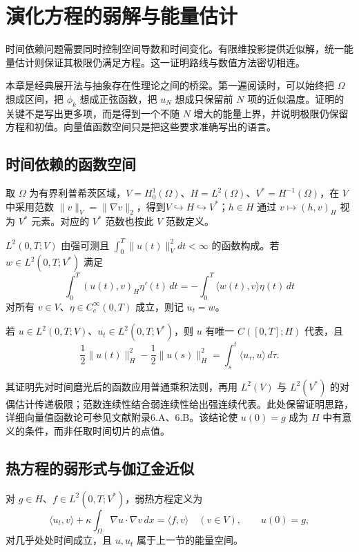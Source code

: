 \documentclass[UTF8,12pt,a4paper,fontset=fandol]{ctexbook}
\begin{document}
\chapter{演化方程的弱解与能量估计}
\label{chap:evolution-weak}

时间依赖问题需要同时控制空间导数和时间变化。有限维投影提供近似解，统一能量估计则保证其极限仍满足方程。这一证明路线与数值方法密切相连。

本章是经典展开法与抽象存在性理论之间的桥梁。第一遍阅读时，可以始终把 $\Omega$ 想成区间，把 $\phi_k$ 想成正弦函数，把 $u_N$ 想成只保留前 $N$ 项的近似温度。证明的关键不是写出更多项，而是得到一个不随 $N$ 增大的能量上界，并说明极限仍保留方程和初值。向量值函数空间只是把这些要求准确写出的语言。

\section{时间依赖的函数空间}
取 $\Omega$ 为有界利普希茨区域，$V=H_0^1(\Omega)$、$H=L^2(\Omega)$、$V^*=H^{-1}(\Omega)$，在 $V$ 中采用范数 $\|v\|_V=\|\nabla v\|_2$，得到$V\hookrightarrow H\hookrightarrow V^*$；$h\in H$ 通过 $v\mapsto(h,v)_H$ 视为 $V^*$ 元素。对应的 $V^*$ 范数也按此 $V$ 范数定义。

$L^2(0,T;V)$ 由强可测且 $\int_0^T\|u(t)\|_V^2dt<\infty$ 的函数构成。若 $w\in L^2(0,T;V^*)$ 满足
\[
 \int_0^T(u(t),v)_H\eta'(t)\,dt
 =-\int_0^T\langle w(t),v\rangle\eta(t)\,dt
\]
对所有 $v\in V$、$\eta\in C_c^\infty(0,T)$ 成立，则记 $u_t=w$。

\begin{theorem}[能量空间的时间连续性]
若 $u\in L^2(0,T;V)$、$u_t\in L^2(0,T;V^*)$，则 $u$ 有唯一 $C([0,T];H)$ 代表，且
\begin{equation}
 \frac12\|u(t)\|_H^2-\frac12\|u(s)\|_H^2
 =\int_s^t\langle u_\tau,u\rangle\,d\tau.
 \label{eq:hilbert-triple-energy}
\end{equation}
\end{theorem}
其证明先对时间磨光后的函数应用普通乘积法则，再用 $L^2(V)$ 与 $L^2(V^*)$ 的对偶估计传递极限；范数连续性结合弱连续性给出强连续代表。此处保留证明思路，详细向量值函数论可参见文献\cite{hunter}附录6.A、6.B。该结论使 $u(0)=g$ 成为 $H$ 中有意义的条件，而非任取时间切片的点值。

\section{热方程的弱形式与伽辽金近似}
对 $g\in H$、$f\in L^2(0,T;V^*)$，弱热方程定义为
\begin{equation}
 \langle u_t,v\rangle+\kappa\int_\Omega\nabla u\cdot\nabla v\,dx
 =\langle f,v\rangle\quad(v\in V),\qquad u(0)=g,
 \label{eq:weak-heat}
\end{equation}
对几乎处处时间成立，且 $u,u_t$ 属于上一节的能量空间。
\end{document}
